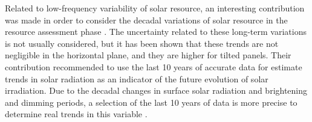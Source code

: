 

Related to low-frequency variability of solar resource, an interesting contribution was made in order to consider the decadal variations of solar resource in the resource assessment phase \cite*{muller2014rethinking}. The uncertainty related to these long-term variations is not usually considered, but it has been shown that these trends are not negligible in the horizontal plane, and they are higher for tilted panels. Their contribution recommended to use the last 10 years of accurate data for estimate trends in solar radiation as an indicator of the future evolution of solar irradiation. Due to the decadal changes in surface solar radiation and brightening and dimming periods, a selection of the last 10 years of data is more precise to determine real trends in this variable \cite*{muller2014rethinking}. %




